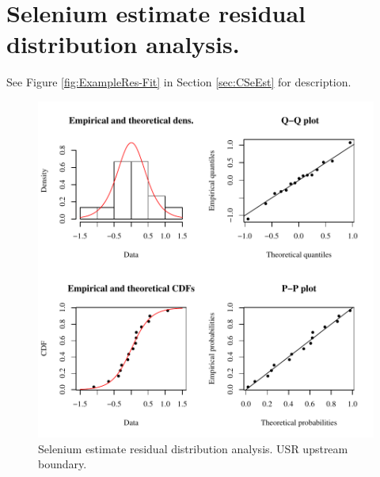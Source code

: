 \section{Selenium estimate residual distribution analysis.}
\label{App:AppResFit}

See Figure \ref{fig:ExampleRes-Fit} in Section \ref{sec:CSeEst} for description.

\begin{figure}[htbp]
	\begin{center}
	\includegraphics[width=6in]{"Figures/Results_USR/Conc Model res-fit U163"}
	\caption{Selenium estimate residual distribution analysis.  USR upstream boundary.}
	\end{center}
\end{figure}
\newpage

